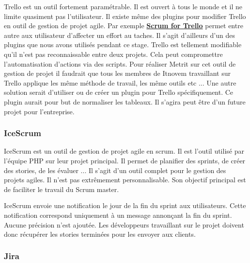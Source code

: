 \documentclass[12pt, twoside, openright]{report}
\begin{document}
Trello est un outil fortement paramétrable. Il est ouvert à tous le monde et il ne limite quasiment pas l'utilisateur. Il existe même des plugins pour modifier Trello en outil de gestion de projet agile. Par exemple \href{https://chrome.google.com/webstore/detail/scrum-for-trello/jdbcdblgjdpmfninkoogcfpnkjmndgje}{\textbf{Scrum for Trello}} permet entre autre aux utilisateur d'affecter un effort au taches. Il s'agit d'ailleurs d'un des plugins que nous avons utilisés pendant ce stage. Trello est tellement modifiable qu'il n'est pas reconnaissable entre deux projets. Cela peut compromettre l'automatisation d'actions via des scripts. Pour réaliser Metrit sur cet outil de gestion de projet il faudrait que tous les membres de Itnovem travaillant sur Trello applique les même méthode de travail, les même outils etc ... Une autre solution serait d'utiliser ou de créer un plugin pour Trello spécifiquement. Ce plugin aurait pour but de normaliser les tableaux. Il s'agira peut être d'un future projet pour l'entreprise.   

\subsubsection{IceScrum}

IceScrum est un outil de gestion de projet agile en scrum. Il est l'outil utilisé par l'équipe PHP sur leur projet principal. Il permet de planifier des sprints, de créer des stories, de les évaluer ... Il s'agit d'un outil complet pour le gestion des projets agiles. Il n'est pas extrêmement personnalisable. Son objectif principal est de faciliter le travail du Scrum master.

IceScrum envoie une notification le jour de la fin du sprint aux utilisateurs. Cette notification correspond uniquement à un message annonçant la fin du sprint. Aucune précision n'est ajoutée. Les développeurs travaillant sur le projet doivent donc récupérer les stories terminées pour les envoyer aux clients.

\subsubsection{Jira}
\end{document}
